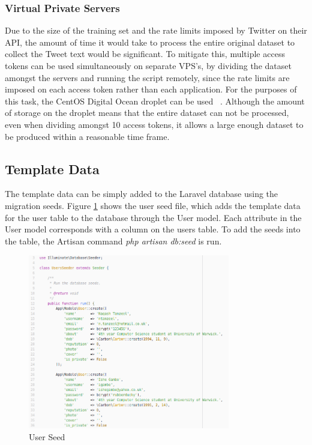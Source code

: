 \subsubsection{Virtual Private Servers}
Due to the size of the training set and the rate limits imposed by Twitter on their API, the amount of time it would take to process the entire original dataset to collect the Tweet text would be significant. To mitigate this, multiple access tokens can be used simultaneously on separate VPS's, by dividing the dataset amongst the servers and running the script remotely, since the rate limits are imposed on each access token rather than each application. For the purposes of this task, the CentOS Digital Ocean droplet can be used ~\cite{DigitalOcean:Home}. Although the amount of storage on the droplet means that the entire dataset can not be processed, even when dividing amongst 10 access tokens, it allows a large enough dataset to be produced within a reasonable time frame.

\subsection{Template Data}
The template data can be simply added to the Laravel database using the migration seeds. Figure \ref{fig:seed} shows the user seed file, which adds the template data for the user table to the database through the User model. Each attribute in the User model corresponds with a column on the users table. To add the seeds into the table, the Artisan command \textit{php artisan db:seed} is run.

\begin{figure}[H]
	\centering
	\includegraphics[height=3in]{Images/Implementation/seed}
	\caption{User Seed} \label{fig:seed}
\end{figure}

